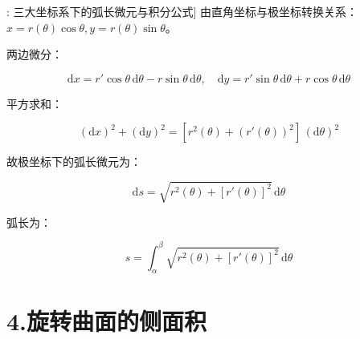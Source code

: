 \documentclass[11pt,a4paper,UTF8]{ctexart}
\begin{document}
\begin{thmbox}[公式[6]: 三大坐标系下的弧长微元与积分公式]
由直角坐标与极坐标转换关系：$x = r(\theta)\cos\theta, y = r(\theta)\sin\theta$。

两边微分：


\begin{equation*}
\mathrm{d}x = r'\cos\theta\,\mathrm{d}\theta - r\sin\theta\,\mathrm{d}\theta, \quad \mathrm{d}y = r'\sin\theta\,\mathrm{d}\theta + r\cos\theta\,\mathrm{d}\theta
\end{equation*}


平方求和：


\begin{equation*}
(\mathrm{d}x)^2 + (\mathrm{d}y)^2 = [r^2(\theta) + (r'(\theta))^2]\,(\mathrm{d}\theta)^2
\end{equation*}


故极坐标下的弧长微元为：


\begin{equation*}
\mathrm{d}s = \sqrt{r^2(\theta) + [r'(\theta)]^2}\,\mathrm{d}\theta
\end{equation*}


弧长为：


\begin{equation*}
s = \int_\alpha^\beta \sqrt{r^2(\theta) + [r'(\theta)]^2}\,\mathrm{d}\theta
\end{equation*}


\end{thmbox}

\section{4.旋转曲面的侧面积}
\end{document}
